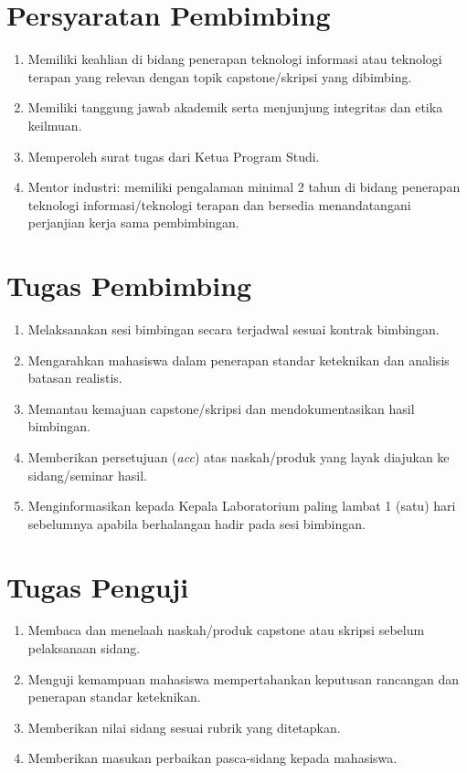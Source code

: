 \documentclass[12pt,a4paper]{report}
\begin{document}
\section{Persyaratan Pembimbing}
\begin{enumerate}
\item Memiliki keahlian di bidang penerapan teknologi informasi atau teknologi terapan yang relevan dengan topik capstone/skripsi yang dibimbing.
\item Memiliki tanggung jawab akademik serta menjunjung integritas dan etika keilmuan.
\item Memperoleh surat tugas dari Ketua Program Studi.
\item Mentor industri: memiliki pengalaman minimal 2 tahun di bidang penerapan teknologi informasi/teknologi terapan dan bersedia menandatangani perjanjian kerja sama pembimbingan.
\end{enumerate}

\section{Tugas Pembimbing}
\begin{enumerate}
\item Melaksanakan sesi bimbingan secara terjadwal sesuai kontrak bimbingan.
\item Mengarahkan mahasiswa dalam penerapan standar keteknikan dan analisis batasan realistis.
\item Memantau kemajuan capstone/skripsi dan mendokumentasikan hasil bimbingan.
\item Memberikan persetujuan (\emph{acc}) atas naskah/produk yang layak diajukan ke sidang/seminar hasil.
\item Menginformasikan kepada Kepala Laboratorium paling lambat 1 (satu) hari sebelumnya apabila berhalangan hadir pada sesi bimbingan.
\end{enumerate}

\section{Tugas Penguji}
\begin{enumerate}
\item Membaca dan menelaah naskah/produk capstone atau skripsi sebelum pelaksanaan sidang.
\item Menguji kemampuan mahasiswa mempertahankan keputusan rancangan dan penerapan standar keteknikan.
\item Memberikan nilai sidang sesuai rubrik yang ditetapkan.
\item Memberikan masukan perbaikan pasca-sidang kepada mahasiswa.
\end{enumerate}
\end{document}

